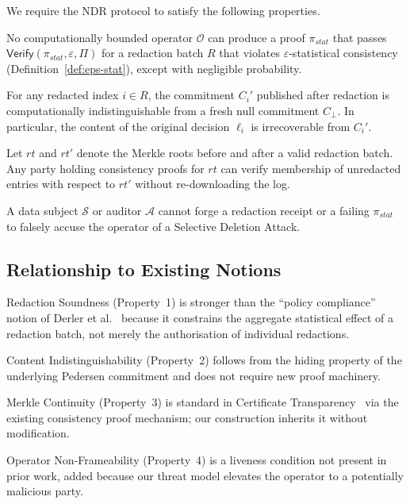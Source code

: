 We require the NDR protocol to satisfy the following properties.

\begin{property}
No computationally bounded operator $\mathcal{O}$ can produce a proof
$\pi_{\mathit{stat}}$ that passes
$\mathsf{Verify}(\pi_{\mathit{stat}}, \varepsilon, \Pi)$ for a redaction
batch $R$ that violates $\varepsilon$-statistical consistency
(Definition~\ref{def:eps-stat}), except with negligible probability.
\end{property}

\begin{property}
For any redacted index $i \in R$, the commitment $C_i'$ published after
redaction is computationally indistinguishable from a fresh null
commitment $C_{\bot}$. In particular, the content of the original decision
$\ell_i$ is irrecoverable from $C_i'$.
\end{property}

\begin{property}
Let $\mathit{rt}$ and $\mathit{rt}'$ denote the Merkle roots before and
after a valid redaction batch. Any party holding consistency proofs for
$\mathit{rt}$ can verify membership of unredacted entries with respect to
$\mathit{rt}'$ without re-downloading the log.
\end{property}

\begin{property}
A data subject $\mathcal{S}$ or auditor $\mathcal{A}$ cannot forge a
redaction receipt or a failing $\pi_{\mathit{stat}}$ to falsely accuse
the operator of a Selective Deletion Attack.
\end{property}

\subsection{Relationship to Existing Notions}

Redaction Soundness (Property~1) is stronger than the
``policy compliance'' notion of Derler et al.~\cite{derler2019} because
it constrains the aggregate statistical effect of a redaction batch, not
merely the authorisation of individual redactions.

Content Indistinguishability (Property~2) follows from the hiding
property of the underlying Pedersen commitment and does not require
new proof machinery.

Merkle Continuity (Property~3) is standard in Certificate
Transparency~\cite{rfc6962} via the existing consistency proof mechanism;
our construction inherits it without modification.

Operator Non-Frameability (Property~4) is a liveness condition not
present in prior work, added because our threat model elevates the
operator to a potentially malicious party.
